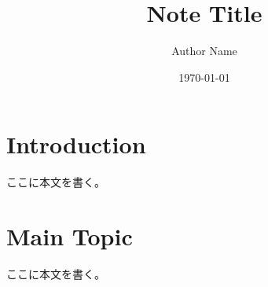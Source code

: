 \documentclass[uplatex,dvipdfmx,11pt,a4paper]{jsarticle}
\title{Note Title}
\author{Author Name}
\date{\today}
\begin{document}
\maketitle
\tableofcontents

\section{Introduction}

ここに本文を書く。

\section{Main Topic}

ここに本文を書く。



\end{document}
